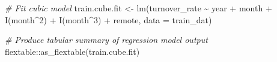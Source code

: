 \documentclass[
]{book}
\newenvironment{Shaded}{\begin{snugshade}}{\end{snugshade}}
\newcommand{\AttributeTok}[1]{\textcolor[rgb]{0.77,0.63,0.00}{#1}}
\newcommand{\CommentTok}[1]{\textcolor[rgb]{0.56,0.35,0.01}{\textit{#1}}}
\newcommand{\DecValTok}[1]{\textcolor[rgb]{0.00,0.00,0.81}{#1}}
\newcommand{\FunctionTok}[1]{\textcolor[rgb]{0.00,0.00,0.00}{#1}}
\newcommand{\NormalTok}[1]{#1}
\newcommand{\OtherTok}[1]{\textcolor[rgb]{0.56,0.35,0.01}{#1}}
\newcommand{\SpecialCharTok}[1]{\textcolor[rgb]{0.00,0.00,0.00}{#1}}
\begin{document}
\begin{Shaded}
\begin{Highlighting}[]
\CommentTok{\# Fit cubic model}
\NormalTok{train.cube.fit }\OtherTok{\textless{}{-}} \FunctionTok{lm}\NormalTok{(turnover\_rate }\SpecialCharTok{\textasciitilde{}}\NormalTok{ year }\SpecialCharTok{+}\NormalTok{ month }\SpecialCharTok{+} \FunctionTok{I}\NormalTok{(month}\SpecialCharTok{\^{}}\DecValTok{2}\NormalTok{) }\SpecialCharTok{+} \FunctionTok{I}\NormalTok{(month}\SpecialCharTok{\^{}}\DecValTok{3}\NormalTok{) }\SpecialCharTok{+}\NormalTok{ remote, }\AttributeTok{data =}\NormalTok{ train\_dat)}

\CommentTok{\# Produce tabular summary of regression model output}
\NormalTok{flextable}\SpecialCharTok{::}\FunctionTok{as\_flextable}\NormalTok{(train.cube.fit)}
\end{Highlighting}
\end{Shaded}

\providecommand{\docline}[3]{\noalign{\global\setlength{\arrayrulewidth}{#1}}\arrayrulecolor[HTML]{#2}\cline{#3}}

\setlength{\tabcolsep}{2pt}

\renewcommand*{\arraystretch}{1.5}
\end{document}

